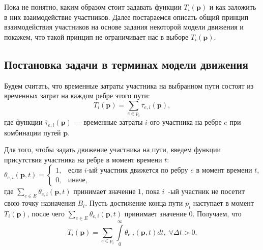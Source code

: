 \documentclass[12pt, a4paper]{article}
\begin{document}
Пока не понятно, каким образом стоит задавать функции $T_i (\textbf{p})$ и как заложить в них взаимодействие участников. Далее постараемся описать общий принцип взаимодействия участников на основе задания некоторой модели движения и покажем, что такой принцип не ограничивает нас в выборе $T_i (\textbf{p})$.

\subsection{Постановка задачи в терминах модели движения}

\label{sec:concrete}
Будем считать, что временные затраты участника на выбранном пути состоят из временных затрат на каждом ребре этого пути:
$$T_i (\textbf{p}) = \sum \limits_{e \in p_i} \overline{\tau}_{e, i} (\textbf{p}), $$
где функции $\overline{\tau}_{e, i} (\textbf{p})$ --- временные затраты $i$-ого участника на ребре $e$ при комбинации путей $\textbf{p}$. 


Для того, чтобы задать движение участника на пути, введем функции присутствия участника на ребре в момент времени $t$:
$$
\theta_{e, i} (\textbf{p}, t) =
\begin{cases}
	1, & \text{если }  i\text{-ый участник движется по ребру $e$ в момент времени $t$,}  \\
	0, & \text{иначе},
\end{cases}
$$
где $\sum\limits_{e \in E} \theta_{e, i} (\textbf{p}, t)$ принимает значение $1$, пока $i$~-ый участник не посетит свою точку назначения $B_i$. Пусть достижение конца пути $p_i$ наступает в момент $T_i(\textbf{p})$, после чего $\sum\limits_{e \in E} \theta_{e, i} (\textbf{p}, t)$ принимает значение $0$. Получаем, что
\begin{equation}
	\label{eq:T_i_by_theta}
	T_i(\textbf{p}) = \sum \limits_{e \in p_i} \int\limits_{0}^{\infty} \theta_{e, i} (\textbf{p}, t) dt, \; \forall \Delta t > 0.
\end{equation}
\end{document}
